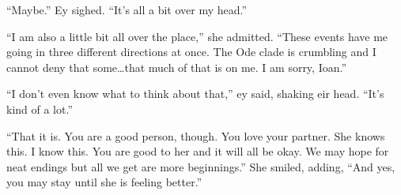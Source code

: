 ``Maybe.'' Ey sighed. ``It's all a bit over my head.''

``I am also a little bit all over the place,'' she admitted. ``These events have me going in three different directions at once. The Ode clade is crumbling and I cannot deny that some\ldots that much of that is on me. I am sorry, Ioan.''

``I don't even know what to think about that,'' ey said, shaking eir head. ``It's kind of a lot.''

``That it is. You are a good person, though. You love your partner. She knows this. I know this. You are good to her and it will all be okay. We may hope for neat endings but all we get are more beginnings.'' She smiled, adding, ``And yes, you may stay until she is feeling better.''
